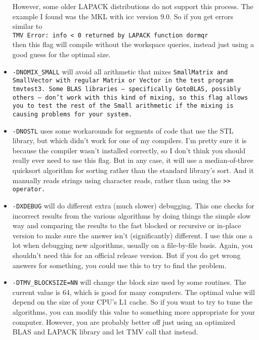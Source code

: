\begin{itemize}
However, some older LAPACK distributions do not support
this process.  The example I found was the MKL with icc version 9.0.
So if you get errors similar to \\
\texttt{TMV Error: info < 0 returned by LAPACK function dormqr}\\
then this flag will compile without the workspace queries, instead just
using a good guess for the optimal size.

\item
\texttt{-DNOMIX\_SMALL} will avoid all arithmetic that mixes \tt{SmallMatrix} and \tt{SmallVector} 
with regular \tt{Matrix} or \tt{Vector} in the test program \texttt{tmvtest3}.
Some BLAS libraries -- specifically GotoBLAS, possibly others -- 
don't work with this kind of mixing, so this flag allows you to test
the rest of the \tt{Small} arithmetic if the mixing is causing problems for your
system.  

\item
\texttt{-DNOSTL} uses some workarounds for segments of code that use the STL
library, but which didn't work for one of my compilers.  I'm pretty sure it is
because the compiler wasn't installed correctly, so I don't think you
should really ever need to use this flag.  
But in any case, it 
will use a median-of-three quicksort algorithm for sorting
rather than the standard library's sort.  And it manually reads strings 
using character reads, rather than using the \tt{>>} operator.  

\item
\texttt{-DXDEBUG} will do different extra (much slower) debugging.  This one checks for
incorrect results from the various algorithms by doing things the simple slow way
and comparing the results to the fast blocked or recursive or in-place version
to make sure the answer isn't (significantly) different.  
I use this one a lot when debugging
new algorithms, usually on a file-by-file basis.  Again, you shouldn't need this for
an official release version.  But if you do get wrong answers for something, you could
use this to try to find the problem.

\item
\texttt{-DTMV\_BLOCKSIZE=NN} will change the block size used by some routines.  
The current value is 64, which is good for many computers.  
The optimal value will depend on the size of your
CPU's L1 cache.  So if you want to try to tune the algorithms, you can 
modify this value to something more appropriate for your computer.
However, you are probably better off just using an optimized BLAS and LAPACK
library and let TMV call that instead.
\end{itemize}

